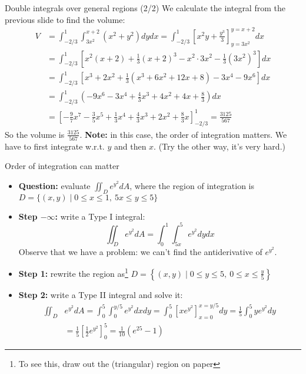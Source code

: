 \begin{frame}{Double integrals over general regions (2/2)}
\small
         We calculate the integral from the previous slide to find the volume:
         \begin{align*}
             V&=\int_{-2/3}^{1}\int_{3x^2}^{x+2}(x^2+y^2)dydx=\int_{-2/3}^{1}\left[x^2y+\frac{y^3}{3}\right]_{y=3x^2}^{y=x+2}dx\\
              &=\int_{-2/3}^{1}\left[x^2(x+2)+\frac{1}{3}(x+2)^3-x^2\cdot3x^2-\frac{1}{3}(3x^2)^3\right]dx\\
              &=\int_{-2/3}^{1}\left[x^3+2x^2+\frac{1}{3}\left(x^3+6x^2+12x+8\right)-3x^4-9x^6\right]dx\\
              &=\int_{-2/3}^{1}\left(-9x^6-3x^4+\frac{4}{3}x^3+4x^2+4x+\frac{8}{3}\right)dx\\
              &=\left[-\frac{9}{7}x^7-\frac{3}{5}x^5+\frac{1}{3}x^4+\frac{4}{3}x^3+2x^2+\frac{8}{3}x\right]_{-2/3}^{1} =\boxed{ \frac{3125}{567}}
         \end{align*}
         So the volume is $\frac{3125}{567}$. \textbf{Note:} in this case, the order of integration matters. We have to first integrate w.r.t. $y$ and then $x$. (Try the other way, it's very hard.)
\end{frame}

\begin{frame}{Order of integration can matter}
    \small
    \begin{itemize}
        \item \textbf{Question:} evaluate $\iint_De^{y^2}dA$, where the region of integration is
            $D=\{(x,y)\mid 0\leq x\leq1,~5x\leq y\leq5\}$
        \item \textbf{Step $\pmb{-\infty}$:} write a Type I integral:
            \[\iint_De^{y^2}dA=\int_0^1\int_{5x}^5e^{y^2}dydx\]
        Observe that we have a problem: we can't find the antiderivative of $e^{y^2}$.
        \item \textbf{Step 1:} rewrite the region as\footnote{To see this, draw out the (triangular) region on paper}
            $D=\left\{(x,y)\mid 0\leq y\leq5,~0\leq x\leq\frac{y}{5}\right\}$
        \item \textbf{Step 2:} write a Type II integral and solve it:
            \begin{align*}
                \iint_D&e^{y^2}dA=\int_0^5\int_0^{y/5}e^{y^2}dxdy = \int_0^5 \left[xe^{y^2}\right]_{x=0}^{x=y/5}dy=\frac{1}{5}\int_0^5ye^{y^2}dy\\
                &=\frac{1}{5}\left[\frac{1}{2}e^{y^2}\right]_0^5=\boxed{\frac{1}{10}(e^{25}-1)}
            \end{align*}
    \end{itemize}
\end{frame}

